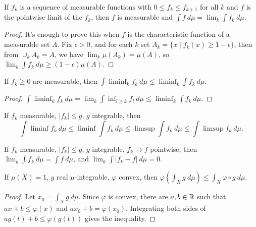 \documentclass[letterpaper,11pt]{report}
\begin{document}
\begin{thm}\label{monotone-convergence} If $f_k$ is a sequence of measurable functions with $0 \le f_k \le f_{k+1}$ for all $k$ and $f$ is the pointwise limit of the $f_k$, then $f$ is measurable and $\int f\ d\mu = \lim_k \int f_k\ d\mu$.
\end{thm}
\begin{proof} It's enough to prove this when $f$ is the characteristic function of a measurable set $A$. Fix $\epsilon > 0$, and for each $k$ set $A_k = \{x \mid f_k(x) \ge 1-\epsilon\}$, then from $\cup_k A_k = A$, we have $\lim_k \mu(A_k) = \mu(A)$, so $\lim_k \int f_k\ d\mu \ge (1-\epsilon)\mu(A)$.
\end{proof}

\begin{lem} If $f_k \ge 0$ are measurable, then $\int \liminf_k f_k\ d\mu \le \liminf_k \int f_k\ d\mu$.
\end{lem}
\begin{proof} $\int \liminf_k f_k\ d\mu = \lim_k \int \inf_{l\ge k} f_l\ d\mu \le \liminf_k \int f_k\ d\mu$.
\end{proof}

\begin{cor} If $f_k$ measurable, $|f_k| \le g$, $g$ integrable, then
\[
\int \liminf f_k\ d\mu \le \liminf \int f_k\ d\mu \le \limsup \int f_k\ d\mu \le \int \limsup f_k\ d\mu.
\]
\end{cor}

\begin{thm}\label{dominated-convergence} If $f_k$ measurable, $|f_k| \le g$, $g$ integrable, $f_k \rightarrow f$ pointwise, then $\lim_k \int f_k\ d\mu = \int f\ d\mu$, and $\lim_k \int |f_k - f|\ d\mu = 0$.
\end{thm}

\begin{thm}[Jensen]\label{jensen} If $\mu(X) = 1$, $g$ real $\mu$-integrable, $\varphi$ convex, then $\varphi(\int_X g\ d\mu) \le \int_X \varphi \circ g\ d\mu$.
\end{thm}
\begin{proof} Let $x_0 = \int_X g\ d\mu$. Since $\varphi$ is convex, there are $a,b \in \mathbb{R}$ such that $ax+b \le \varphi(x)$ and $ax_0+b = \varphi(x_0)$. Integrating both sides of $ag(t) + b \le \varphi(g(t))$ gives the inequality.
\end{proof}
\end{document}
